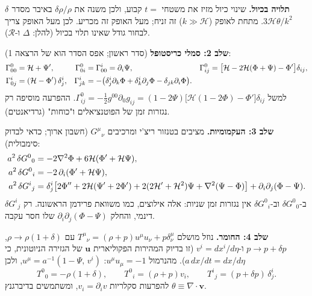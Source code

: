 \begin{warnbox}
\textbf{$\delta$ תלויה בכיול.} שינוי כיול מזיז את משטחי $t=$ קבוע, ולכן משנה את $\delta\rho/\rho$ באיבר מסדר $3\mathcal H\theta/k^2$. מתחת לאופק ($k\gg\mathcal H$) זה זניח; מעל האופק זה מכריע. לכן מעל האופק צריך לבחור גודל שאינו תלוי בכיול (להלן: $\Delta$ ו-$\mathcal R$).
\end{warnbox}

\textbf{שלב 2: סמלי כריסטופל} (סדר ראשון; אפס הסדר הוא של הרצאה 1):
\begin{align}
\Gamma^0_{00}&=\mathcal H+\Psi', & \Gamma^0_{0i}&=\Gamma^i_{00}=\partial_i\Psi, & \Gamma^0_{ij}&=\big[\mathcal H-2\mathcal H(\Phi+\Psi)-\Phi'\big]\delta_{ij},\notag\\
\Gamma^i_{0j}&=(\mathcal H-\Phi')\,\delta^i_j, & \Gamma^i_{jk}&=-\big(\delta^i_j\partial_k\Phi+\delta^i_k\partial_j\Phi-\delta_{jk}\partial_i\Phi\big). &&
\end{align}
למשל $\Gamma^0_{ij}=-\tfrac12g^{00}\partial_0g_{ij}=(1-2\Psi)\big[\mathcal H(1-2\Phi)-\Phi'\big]\delta_{ij}$. ההפרעה מוסיפה רק נגזרות זמן של הפוטנציאלים ו"כוחות" (גרדיאנטים).

\textbf{שלב 3: העקמומיות.} מציבים בטנזור ריצ'י ומרכיבים $G^\mu{}_\nu$ (חשבון ארוך; כדאי לבדוק סימבולית):
\begin{align}
a^2\,\delta G^0{}_0&=-2\nabla^2\Phi+6\mathcal H(\Phi'+\mathcal H\Psi),\notag\\
a^2\,\delta G^0{}_i&=-2\,\partial_i(\Phi'+\mathcal H\Psi),\notag\\
a^2\,\delta G^i{}_j&=\delta^i_j\big[2\Phi''+2\mathcal H(\Psi'+2\Phi')+2(2\mathcal H'+\mathcal H^2)\Psi+\nabla^2(\Psi-\Phi)\big]+\partial_i\partial_j(\Phi-\Psi).
\end{align}
ב-$\delta G^0{}_0$ וב-$\delta G^0{}_i$ אין נגזרות זמן שניות: אלה אילוצים, כמו משוואת פרידמן הראשונה. רק $\delta G^i{}_j$ דינמי, והחלק $\partial_i\partial_j(\Phi-\Psi)$ שלו חסר עקבה.

\textbf{שלב 4: החומר.} נוזל מושלם $T^\mu{}_\nu=(\rho+p)u^\mu u_\nu+p\delta^\mu_\nu$ עם $\rho\to\rho(1+\delta)$, $p\to p+\delta p$ ו-$v^i=dx^i/d\eta$ (זו בדיוק המהירות הפקוליארית $\mathbf u$ של הגזירה הניוטונית, כי $a\,dx/dt=dx/d\eta$). מהנרמול $u^\mu u_\mu=-1$: $u^\mu=a^{-1}(1-\Psi,\,v^i)$, ולכן
\begin{equation}
T^0{}_0=-\rho(1+\delta),\qquad T^0{}_i=(\rho+p)v_i,\qquad T^i{}_j=(p+\delta p)\,\delta^i_j .
\end{equation}
להפרעות סקלריות $v_i=\partial_iv$, ומשתמשים בדיברגנץ $\theta\equiv\nabla\!\cdot\mathbf v$.

